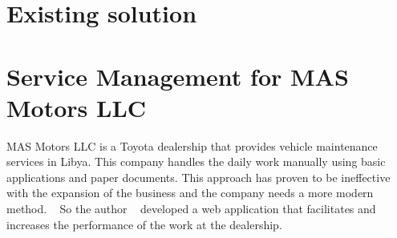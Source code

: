 




\section{Existing solution}


\section{Service Management for MAS Motors LLC}
MAS Motors LLC is a Toyota dealership that provides vehicle maintenance services in Libya.
This company handles the daily work manually using basic applications and paper documents.
This approach has proven to be ineffective with the expansion of the business and the company needs a more modern method. ~\cite{MAS_MOTORS}
So the author ~\citet{MAS_MOTORS} developed a web application that facilitates and increases the performance of the work at the dealership.

